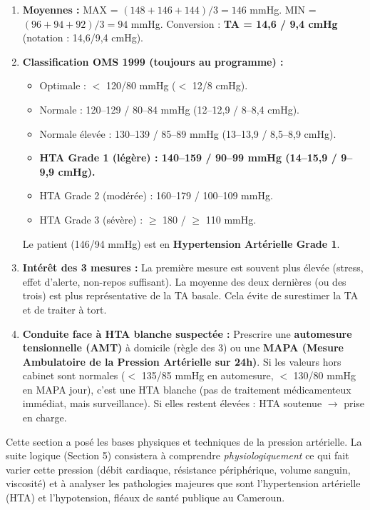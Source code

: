 \documentclass[11pt]{article}
\begin{document}
\begin{corrige}
\begin{enumerate}
    \item \textbf{Moyennes :} MAX = $(148 + 146 + 144)/3 = 146$ mmHg. MIN = $(96 + 94 + 92)/3 = 94$ mmHg.
    Conversion : \textbf{TA = 14,6 / 9,4 cmHg} (notation : 14,6/9,4 cmHg).
    \item \textbf{Classification OMS 1999 (toujours au programme) :}
    \begin{itemize}
        \item Optimale : $<$ 120/80 mmHg ($<$ 12/8 cmHg).
        \item Normale : 120--129 / 80--84 mmHg (12--12,9 / 8--8,4 cmHg).
        \item Normale élevée : 130--139 / 85--89 mmHg (13--13,9 / 8,5--8,9 cmHg).
        \item \textbf{HTA Grade 1 (légère) : 140--159 / 90--99 mmHg (14--15,9 / 9--9,9 cmHg).}
        \item HTA Grade 2 (modérée) : 160--179 / 100--109 mmHg.
        \item HTA Grade 3 (sévère) : $\ge$ 180 / $\ge$ 110 mmHg.
    \end{itemize}
    Le patient (146/94 mmHg) est en \textbf{Hypertension Artérielle Grade 1}.
    \item \textbf{Intérêt des 3 mesures :} La première mesure est souvent plus élevée (stress, effet d'alerte, non-repos suffisant). La moyenne des deux dernières (ou des trois) est plus représentative de la TA basale. Cela évite de surestimer la TA et de traiter à tort.
    \item \textbf{Conduite face à HTA blanche suspectée :} Prescrire une \textbf{automesure tensionnelle (AMT)} à domicile (règle des 3) ou une \textbf{MAPA (Mesure Ambulatoire de la Pression Artérielle sur 24h)}. Si les valeurs hors cabinet sont normales ($<$ 135/85 mmHg en automesure, $<$ 130/80 mmHg en MAPA jour), c'est une HTA blanche (pas de traitement médicamenteux immédiat, mais surveillance). Si elles restent élevées : HTA soutenue $\rightarrow$ prise en charge.
\end{enumerate}
\end{corrige}

Cette section a posé les bases physiques et techniques de la pression artérielle. La suite logique (Section 5) consistera à comprendre \emph{physiologiquement} ce qui fait varier cette pression (débit cardiaque, résistance périphérique, volume sanguin, viscosité) et à analyser les pathologies majeures que sont l'hypertension artérielle (HTA) et l'hypotension, fléaux de santé publique au Cameroun.
\end{document}

